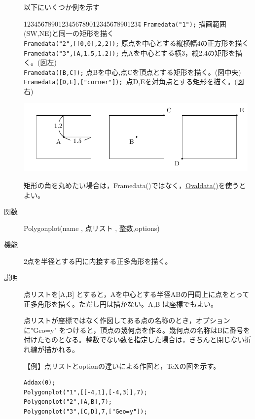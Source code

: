 \documentclass[papersize,a4paper,12pt,uplatex]{jsarticle}
\begin{document}
\begin{description}
以下にいくつか例を示す
\begin{tabbing}
1234567890123456789012345678901234\=\kill
\verb|Framedata("1");|\> 描画範囲(SW,NE)と同一の矩形を描く\\
\verb|Framedata("2",[[0,0],2,2]);| \> 原点を中心とする縦横幅4の正方形を描く\\
\verb|Framedata("3",[A,1.5,1.2]);|\> 点Aを中心とする横3，縦2.4の矩形を描く。(図左)\\
\verb|Framedata([B,C]);|\> 点Bを中心,点Cを頂点とする矩形を描く。(図中央)\\
\verb|Framedata([D,E],["corner"]); |\>点D,Eを対角点とする矩形を描く。(図右)
 \end{tabbing}
\begin{center}\includegraphics[bb=0.00 0.00 348.15 106.16,width=12cm]{Fig/Framedata.pdf}\end{center}

矩形の角を丸めたい場合は，Framedata()ではなく，\hyperlink{ovaldata}{Ovaldata()}を使うとよい。
 
\vspace{\baselineskip}
\hypertarget{polygonplot}{}
\item[関数]Polygonplot(name , 点リスト , 整数,options)
\item[機能]2点を半径とする円に内接する正多角形を描く。
\item[説明]点リストを[A,B] とすると，Aを中心とする半径ABの円周上に点をとって正多角形を描く。ただし円は描かない。A,B は座標でもよい。

点リストが座標ではなく作図してある点の名称のとき，オプションに"Geo=y" をつけると，頂点の幾何点を作る。幾何点の名称はBに番号を付けたものとなる。整数でない数を指定した場合は，きちんと閉じない折れ線が描かれる。

\vspace{\baselineskip}
【例】点リストとoptionの違いによる作図と，TeXの図を示す。

\begin{verbatim}
Addax(0);
Polygonplot("1",[[-4,1],[-4,3]],7);
Polygonplot("2",[A,B],7);
Polygonplot("3",[C,D],7,["Geo=y"]);
\end{verbatim}


\end{description}
\end{document}
